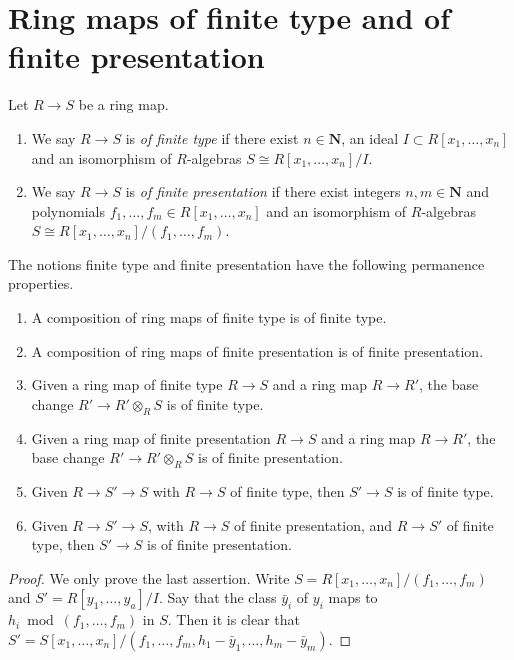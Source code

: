 \section{Ring maps of finite type and of finite presentation}
\label{section-finite-type}

\begin{definition}
\label{definition-finite-type}
Let $R \to S$ be a ring map.
\begin{enumerate}
\item We say $R \to S$ is {\it of finite type} if there exist
$n \in \mathbf{N}$, an ideal $I \subset R[x_1, \ldots, x_n]$ and
an isomorphism of $R$-algebras $S \cong R[x_1, \ldots, x_n]/I$.
\item We say $R \to S$ is {\it of finite presentation} if there
exist integers $n, m \in \mathbf{N}$ and polynomials
$f_1, \ldots, f_m \in R[x_1, \ldots, x_n]$
and an isomorphism of $R$-algebras
$S \cong R[x_1, \ldots, x_n]/(f_1, \ldots, f_m)$.
\end{enumerate}
\end{definition}

\begin{lemma}
\label{lemma-compose-finite-type}
The notions finite type and finite presentation have the following
permanence properties.
\begin{enumerate}
\item A composition of ring maps of finite type is of finite type.
\item A composition of ring maps of finite presentation is of finite
presentation.
\item Given a ring map of finite type $R \to S$ and a ring map $R \to R'$,
the base change $R' \to R' \otimes_R S$ is of finite type.
\item Given a ring map of finite presentation $R \to S$
and a ring map $R \to R'$, the base change $R' \to R' \otimes_R S$
is of finite presentation.
\item Given $R \to S' \to S$ with $R \to S$ of finite type,
then $S' \to S$ is of finite type.
\item Given $R \to S' \to S$, with $R \to S$ of finite presentation,
and $R \to S'$ of finite type, then $S' \to S$ is of finite presentation.
\end{enumerate}
\end{lemma}

\begin{proof}
We only prove the last assertion.
Write $S = R[x_1, \ldots, x_n]/(f_1, \ldots, f_m)$
and $S' = R[y_1, \ldots, y_a]/I$. Say that the class
$\bar y_i$ of $y_i$ maps
to $h_i \bmod (f_1, \ldots, f_m)$ in $S$.
Then it is clear that
$S' = S[x_1, \ldots, x_n]/(f_1, \ldots, f_m,
h_1 - \bar y_1, \ldots, h_m - \bar y_m)$.
\end{proof}










